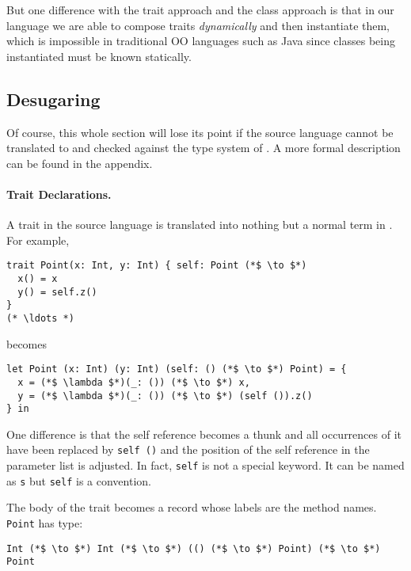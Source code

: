 But one difference with
the trait approach and the class approach is that in our language we are able to
compose traits \emph{dynamically} and then instantiate them, which is impossible
in traditional OO languages such as Java since classes being instantiated must
be known statically.

\subsection{Desugaring}

Of course, this whole section will lose its point if the source language cannot
be translated to \name and checked against the type system of \name. A more
formal description can be found in the appendix.

\paragraph{Trait Declarations.} A trait in the source language is translated into
nothing but a normal term in \name. For example,

\begin{lstlisting}
trait Point(x: Int, y: Int) { self: Point (*$ \to $*)
  x() = x
  y() = self.z()
}
(* \ldots *)
\end{lstlisting}

becomes

\begin{lstlisting}
let Point (x: Int) (y: Int) (self: () (*$ \to $*) Point) = {
  x = (*$ \lambda $*)(_: ()) (*$ \to $*) x,
  y = (*$ \lambda $*)(_: ()) (*$ \to $*) (self ()).z()
} in
\end{lstlisting}

One difference is that the self reference becomes a thunk and all occurrences of
it have been replaced by \lstinline$self ()$ and the position of the self
reference in the parameter list is adjusted. In fact, \lstinline$self$ is not a
special keyword. It can be named as \lstinline$s$ but \lstinline$self$ is a
convention.

The body of the trait becomes a record whose labels are the method names.
\lstinline$Point$ has type:

\begin{lstlisting}
Int (*$ \to $*) Int (*$ \to $*) (() (*$ \to $*) Point) (*$ \to $*) Point
\end{lstlisting}

